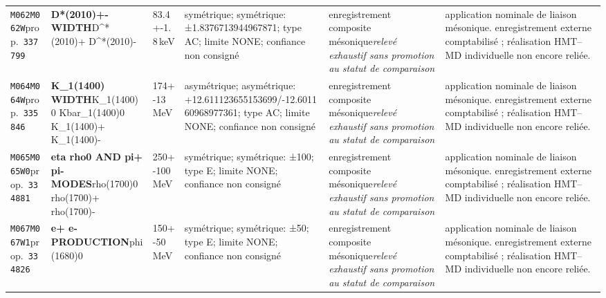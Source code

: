 \begin{landscape}
\begin{longtable}{L{1.85cm}L{4.45cm}L{2.35cm}L{4.05cm}L{3.35cm}L{7.15cm}}
\texttt{M062}\newline \texttt{M062W}\newline prop.\ \texttt{337799} & \textbf{D*(2010)+- WIDTH}\newline D\textasciicircum{}*(2010)+ \textbar{}\allowbreak{} D\textasciicircum{}*(2010)- & 83.4+-1.8\,keV & symétrique; symétrique: ±1.8376713944967871; type AC; limite NONE; confiance non consigné & enregistrement composite mésonique\newline \emph{relevé exhaustif sans promotion au statut de comparaison} & application nominale de liaison mésonique. enregistrement externe comptabilisé ; réalisation HMT--MD individuelle non encore reliée. \\
\texttt{M064}\newline \texttt{M064W}\newline prop.\ \texttt{335846} & \textbf{K\_\allowbreak{}1(1400) WIDTH}\newline K\_\allowbreak{}1(1400)0 \textbar{}\allowbreak{} Kbar\_\allowbreak{}1(1400)0 \textbar{}\allowbreak{} K\_\allowbreak{}1(1400)+ \textbar{}\allowbreak{} K\_\allowbreak{}1(1400)- & 174+-13\,MeV & asymétrique; asymétrique: +12.611123655153699/-12.601160968977361; type AC; limite NONE; confiance non consigné & enregistrement composite mésonique\newline \emph{relevé exhaustif sans promotion au statut de comparaison} & application nominale de liaison mésonique. enregistrement externe comptabilisé ; réalisation HMT--MD individuelle non encore reliée. \\
\texttt{M065}\newline \texttt{M065W0}\newline prop.\ \texttt{334881} & \textbf{eta rho0 AND pi+ pi- MODES}\newline rho(1700)0 \textbar{}\allowbreak{} rho(1700)+ \textbar{}\allowbreak{} rho(1700)- & 250+-100\,MeV & symétrique; symétrique: ±100; type E; limite NONE; confiance non consigné & enregistrement composite mésonique\newline \emph{relevé exhaustif sans promotion au statut de comparaison} & application nominale de liaison mésonique. enregistrement externe comptabilisé ; réalisation HMT--MD individuelle non encore reliée. \\
\texttt{M067}\newline \texttt{M067W1}\newline prop.\ \texttt{334826} & \textbf{e+ e- PRODUCTION}\newline phi(1680)0 & 150+-50\,MeV & symétrique; symétrique: ±50; type E; limite NONE; confiance non consigné & enregistrement composite mésonique\newline \emph{relevé exhaustif sans promotion au statut de comparaison} & application nominale de liaison mésonique. enregistrement externe comptabilisé ; réalisation HMT--MD individuelle non encore reliée. \\

\end{longtable}
\end{landscape}
